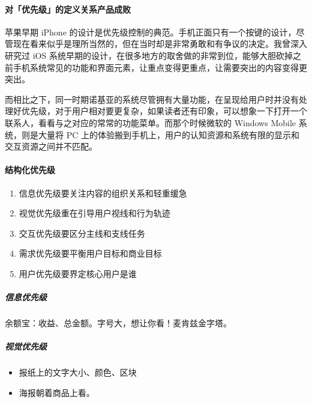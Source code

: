 \documentclass[letterpaper,11pt,english]{sphinxmanual}
\begin{document}
\paragraph{对「优先级」的定义关系产品成败}
\label{\detokenize{chapter_skill/priority:id2}}
苹果早期 iPhone
的设计是优先级控制的典范。手机正面只有一个按键的设计，尽管现在看来似乎是理所当然的，但在当时却是非常勇敢和有争议的决定。我曾深入研究过
iOS
系统早期的设计，在很多地方的取舍做的非常到位，能够大胆砍掉之前手机系统常见的功能和界面元素，让重点变得更重点，让需要突出的内容变得更突出。

而相比之下，同一时期诺基亚的系统尽管拥有大量功能，在呈现给用户时并没有处理好优先级，对于用户相对要更复杂，如果读者还有印象，可以想象一下打开一个联系人，看看与之对应的常常的功能菜单。而那个时候微软的
Windows Mobile 系统，则是大量将 PC
上的体验搬到手机上，用户的认知资源和系统有限的显示和交互资源之间并不匹配。


\paragraph{结构化优先级}
\label{\detokenize{chapter_skill/priority:id3}}\begin{enumerate}
%
\item {} 
信息优先级要关注内容的组织关系和轻重缓急

\item {} 
视觉优先级重在引导用户视线和行为轨迹

\item {} 
交互优先级要区分主线和支线任务

\item {} 
需求优先级要平衡用户目标和商业目标

\item {} 
用户优先级要界定核心用户是谁

\end{enumerate}


\subparagraph{信息优先级}
\label{\detokenize{chapter_skill/priority:id4}}
余额宝：收益、总金额。字号大，想让你看！麦肯兹金字塔。


\subparagraph{视觉优先级}
\label{\detokenize{chapter_skill/priority:id5}}\begin{itemize}
\item {} 
报纸上的文字大小、颜色、区块

\item {} 
海报朝着商品上看。

\end{itemize}
\end{document}
